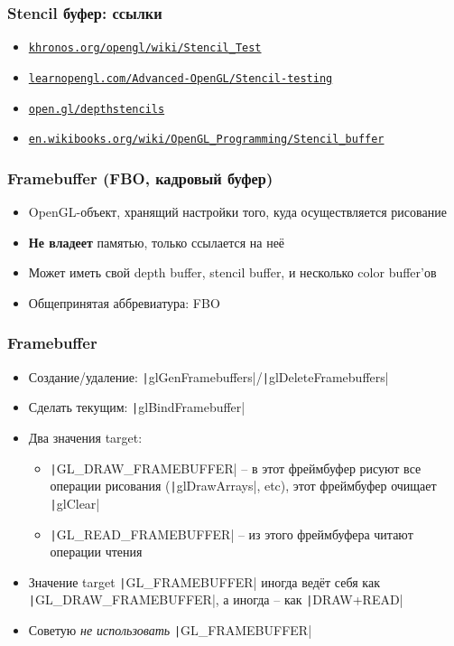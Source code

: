 \documentclass[10pt]{beamer}
\begin{document}
\begin{frame}[fragile]
\frametitle{Stencil буфер: ссылки}
\begin{itemize}
\item \href{https://www.khronos.org/opengl/wiki/Stencil_Test}{\texttt{khronos.org/opengl/wiki/Stencil\_Test}}
\item \href{https://learnopengl.com/Advanced-OpenGL/Stencil-testing}{\texttt{learnopengl.com/Advanced-OpenGL/Stencil-testing}}
\item \href{https://open.gl/depthstencils}{\texttt{open.gl/depthstencils}}
\item \href{https://en.wikibooks.org/wiki/OpenGL_Programming/Stencil_buffer}{\nolinkurl{en.wikibooks.org/wiki/OpenGL_Programming/Stencil_buffer}}
\end{itemize}
\end{frame}

\begin{frame}[fragile]
\frametitle{Framebuffer (FBO, кадровый буфер)}
\begin{itemize}
\item OpenGL-объект, хранящий настройки того, куда осуществляется рисование
\pause
\item \textbf{\alert{Не владеет}} памятью, только ссылается на неё
\pause
\item Может иметь свой depth buffer, stencil buffer, и несколько color buffer'ов
\pause
\item Общепринятая аббревиатура: FBO
\end{itemize}
\end{frame}

\begin{frame}[fragile]
\frametitle{Framebuffer}
\begin{itemize}
\item Создание/удаление: \texttt|glGenFramebuffers|/\texttt|glDeleteFramebuffers|
\pause
\item Сделать текущим: \texttt|glBindFramebuffer|
\pause
\item Два значения target:
\begin{itemize}
\item \texttt|GL_DRAW_FRAMEBUFFER| -- в этот фреймбуфер рисуют все операции рисования (\texttt|glDrawArrays|, etc), этот фреймбуфер очищает \texttt|glClear|
\pause
\item \texttt|GL_READ_FRAMEBUFFER| -- из этого фреймбуфера читают операции чтения
\end{itemize}  
\pause
\item Значение target \texttt|GL_FRAMEBUFFER| иногда ведёт себя как \texttt|GL_DRAW_FRAMEBUFFER|, а иногда -- как \texttt|DRAW+READ|
\item Советую \textit{не использовать} \texttt|GL_FRAMEBUFFER|
\end{itemize}
\end{frame}
\end{document}
